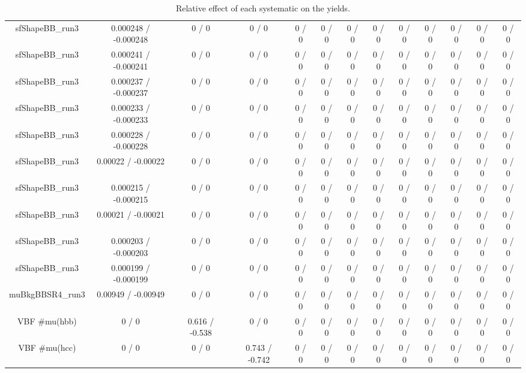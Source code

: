 \documentclass[10pt]{article}
\begin{document}
\begin{table}[htbp]
\begin{center}
\begin{tabular}{|c|c|c|c|c|c|c|c|c|c|c|c|c|}
  sfShapeBB_run3 & 0.000248 / -0.000248 & 0 / 0 & 0 / 0 & 0 / 0 & 0 / 0 & 0 / 0 & 0 / 0 & 0 / 0 & 0 / 0 & 0 / 0 & 0 / 0 & 0 / 0 \\ 
  sfShapeBB_run3 & 0.000241 / -0.000241 & 0 / 0 & 0 / 0 & 0 / 0 & 0 / 0 & 0 / 0 & 0 / 0 & 0 / 0 & 0 / 0 & 0 / 0 & 0 / 0 & 0 / 0 \\ 
  sfShapeBB_run3 & 0.000237 / -0.000237 & 0 / 0 & 0 / 0 & 0 / 0 & 0 / 0 & 0 / 0 & 0 / 0 & 0 / 0 & 0 / 0 & 0 / 0 & 0 / 0 & 0 / 0 \\ 
  sfShapeBB_run3 & 0.000233 / -0.000233 & 0 / 0 & 0 / 0 & 0 / 0 & 0 / 0 & 0 / 0 & 0 / 0 & 0 / 0 & 0 / 0 & 0 / 0 & 0 / 0 & 0 / 0 \\ 
  sfShapeBB_run3 & 0.000228 / -0.000228 & 0 / 0 & 0 / 0 & 0 / 0 & 0 / 0 & 0 / 0 & 0 / 0 & 0 / 0 & 0 / 0 & 0 / 0 & 0 / 0 & 0 / 0 \\ 
  sfShapeBB_run3 & 0.00022 / -0.00022 & 0 / 0 & 0 / 0 & 0 / 0 & 0 / 0 & 0 / 0 & 0 / 0 & 0 / 0 & 0 / 0 & 0 / 0 & 0 / 0 & 0 / 0 \\ 
  sfShapeBB_run3 & 0.000215 / -0.000215 & 0 / 0 & 0 / 0 & 0 / 0 & 0 / 0 & 0 / 0 & 0 / 0 & 0 / 0 & 0 / 0 & 0 / 0 & 0 / 0 & 0 / 0 \\ 
  sfShapeBB_run3 & 0.00021 / -0.00021 & 0 / 0 & 0 / 0 & 0 / 0 & 0 / 0 & 0 / 0 & 0 / 0 & 0 / 0 & 0 / 0 & 0 / 0 & 0 / 0 & 0 / 0 \\ 
  sfShapeBB_run3 & 0.000203 / -0.000203 & 0 / 0 & 0 / 0 & 0 / 0 & 0 / 0 & 0 / 0 & 0 / 0 & 0 / 0 & 0 / 0 & 0 / 0 & 0 / 0 & 0 / 0 \\ 
  sfShapeBB_run3 & 0.000199 / -0.000199 & 0 / 0 & 0 / 0 & 0 / 0 & 0 / 0 & 0 / 0 & 0 / 0 & 0 / 0 & 0 / 0 & 0 / 0 & 0 / 0 & 0 / 0 \\ 
  muBkgBBSR4_run3 & 0.00949 / -0.00949 & 0 / 0 & 0 / 0 & 0 / 0 & 0 / 0 & 0 / 0 & 0 / 0 & 0 / 0 & 0 / 0 & 0 / 0 & 0 / 0 & 0 / 0 \\ 
  VBF #mu(hbb) & 0 / 0 & 0.616 / -0.538 & 0 / 0 & 0 / 0 & 0 / 0 & 0 / 0 & 0 / 0 & 0 / 0 & 0 / 0 & 0 / 0 & 0 / 0 & 0 / 0 \\ 
  VBF #mu(hcc) & 0 / 0 & 0 / 0 & 0.743 / -0.742 & 0 / 0 & 0 / 0 & 0 / 0 & 0 / 0 & 0 / 0 & 0 / 0 & 0 / 0 & 0 / 0 & 0 / 0 \\ 
\hline 
\end{tabular} 
\caption{Relative effect of each systematic on the yields.} 
\end{center} 
\end{table} 
\end{document}
